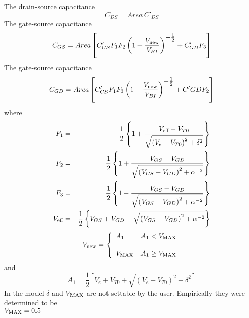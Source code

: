 \noindent
The drain-source capacitance
\begin{equation}
C_{DS} = Area\,C'_{DS}
\end{equation}
The gate-source capacitance
\begin{equation}
C_{GS} = Area\left[C'_{GS}F_1F_2\left(1 - {{\textstyle V_{\mbox{\scriptsize new}}}
   \over{\textstyle V_{BI}}}\right)^{\textstyle - \frac{1}{2}}
   + C'_{GD}F_3\right]
\end{equation}
The gate-source capacitance
\begin{equation}
C_{GD} = Area\left[C'_{GS}F_1F_3\left(1 - {{\textstyle V_{\mbox{\scriptsize new}}}
   \over{\textstyle V_{BI}}}\right)^{\textstyle - \frac{1}{2}}
   + C'{GD}F_2\right]
\end{equation}
where
\begin{eqnarray}
F_1 & = & {{\textstyle 1}\over{\textstyle 2}} \left\{ 1 +
    {{\textstyle V_{\mbox{\scriptsize eff}}-V_{T0}}
    \over{\textstyle\sqrt{\left( V_e-V_{T0}\right)^2+\delta^2}}}\right\}\\
F_2 & = & {{\textstyle 1}\over{\textstyle 2}} \left\{ 1 +
    {{\textstyle V_{GS}-V_{GD}}
    \over{\textstyle\sqrt{\left( V_{GS}-V_{GD}\right)^2+\alpha^{-2}}}}\right\}\\
F_3 & = & {{\textstyle 1}\over{\textstyle 2}} \left\{ 1 -
    {{\textstyle V_{GS}-V_{GD}}
    \over{\textstyle\sqrt{\left( V_{GS}-V_{GD}\right)^2+\alpha^{-2}}}}\right\}\\
V_{\mbox{\scriptsize eff}} & = & {{\textstyle 1}\over{\textstyle 2}} \left\{V_{GS}+V_{GD}+
    \sqrt{\left( V_{GS}-V_{GD}\right)^2+\alpha^{-2}}\right\}\\
\end{eqnarray}
\begin{equation}
V_{\ms{new}} = \left\{ \begin{array}{ll}
    A_1 & A_1 < V_{\ms{MAX}} \\ \\
    V_{\ms{MAX}} & A_1 \ge V_{\ms{MAX}} \\
      \end{array} \right. %
\end{equation}
and
\begin{equation}
    A_1 = \frac{1}{2}\left[V_e + V_{T0}
          + \sqrt{(V_e+V_{T0})^2+\delta^2}\right]
\end{equation}
In the model $\delta$ and $V_{\mbox{\scriptsize MAX}}$ are not
settable by the
user.  Empirically they were determined to be\\[0.1in]
\hspace*{\fill}
$V_{\mbox{\scriptsize MAX}} = 0.5$
\hspace*{\fill}
